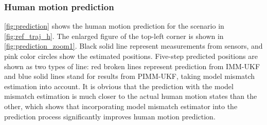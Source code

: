 \documentclass[journal]{IEEEtran}
\DeclareRobustCommand{\clnote}[1]{\ifthenelse{\boolean{include-notes}}%
{\textcolor{orange}{\textbf{CL: #1}}}{}}
\begin{document}
    


	\subsubsection{Human motion prediction}\label{subsubsec:motion_pred}    
    \cref{fig:prediction} shows the human motion prediction for the scenario in \cref{fig:ref_traj_h}. The enlarged figure of the top-left corner is shown in \cref{fig:prediction_zoom1}. Black solid line represent measurements from sensors, and pink color circles show the estimated positions. %
	Five-step predicted positions are shown as two types of line: red broken lines represent prediction from IMM-UKF and blue solid lines stand for results from PIMM-UKF, taking model mismatch estimation into account.
	It is obvious that the prediction with the model mismatch estimation is much closer to the actual human motion states than the other, which shows that incorporating model mismatch estimator into the prediction process significantly improves human motion prediction.
    
\end{document}

